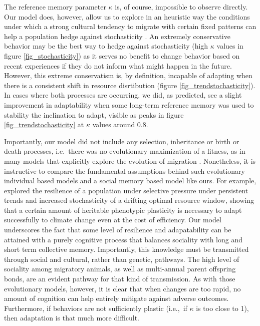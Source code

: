 \documentclass[utf8]{frontiersSCNS} %
\begin{document}
The reference memory parameter $\kappa$ is, of course, impossible to observe directly. Our model does, however, allow us to explore in an heuristic way the conditions under which a strong cultural tendency to migrate with certain fixed patterns can help a population hedge against stochasticity \citep{Abrahms2019,Fagan2019b}.  An extremely conservative behavior may be the best way to hedge against stochasticity (high $\kappa$ values in figure \ref{fig_stochasticity}) as it serves no benefit to change behavior based on recent experiences if they do not inform what might happen in the future. However, this extreme conservatism is, by definition, incapable of adapting when there is a consistent shift in resource disrtibution (figure \ref{fig_trendstochasticity}).  In cases where both processes are occurring, we did, as predicted, see a slight improvement in adaptability when some long-term reference memory was used to stability the inclination to adapt, visible as peaks in figure \ref{fig_trendstochasticity} at $\kappa$ values around 0.8. 

Importantly, our model did not include any selection, inheritance or birth or death processes, i.e.~there was no evolutionary maximization of a fitness, as in many models that explicitly explore the evolution of migration \citep[e.g.][]{Guttal2010, Shaw2013, Anderson2013}. Nonetheless, it is instructive to compare the fundamental assumptions behind such evolutionary individual based models and a social memory based model like ours. For example, \citet{Anderson2013} explored the resilience of a population under selective pressure under persistent trends and increased stochasticity of a drifting optimal resource window, showing that a certain amount of heritable phenotypic plasticity is necessary to adapt successfully to climate change even at the cost of efficiency. Our model underscores the fact that some level of resilience and adapatability can be attained with a purely cognitive process that balances sociality with long and short term collective memory. Importantly, this knowledge must be transmitted through social and cultural, rather than genetic, pathways.  The high level of sociality among migratory animals, as well as multi-annual parent offspring bonds, are an evident pathway for that kind of transmission.  As with those evolutionary models, however, it is clear that when changes are too rapid, no amount of cognition can help entirely mitigate against adverse outcomes. Furthermore, if behaviors are not sufficiently plastic (i.e.,~if $\kappa$ is too close to 1), then adaptation is that much more difficult.
\end{document}
